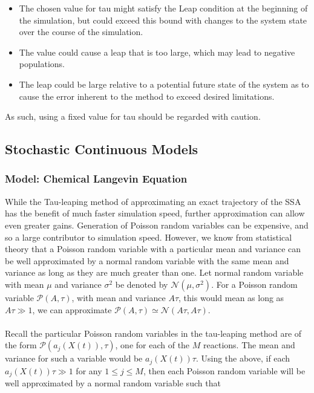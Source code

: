 \documentclass[ugrad,lot,lof,openright,11pt,oneside,onehalfspace]{RUthesis}
\begin{document}
				\begin{itemize}
					\item The chosen value for tau might satisfy the Leap condition at the beginning of the simulation, but could exceed this bound with changes to the system state over the course of the simulation.
					\item The value could cause a leap that is too large, which may lead to negative populations.
					\item The leap could be large relative to a potential future state of the system as to cause the error inherent to the method to exceed desired limitations.
				\end{itemize}

				\noindent
				As such, using a fixed value for tau should be regarded with caution.

		\subsection{Stochastic Continuous Models}

			\subsubsection{Model: Chemical Langevin Equation}

				While the Tau-leaping method of approximating an exact trajectory of the SSA has the benefit of much faster simulation speed, further approximation can allow even greater gains. Generation of Poisson random variables can be expensive, and so a large contributor to simulation speed. However, we know from statistical theory that a Poisson random variable with a particular mean and variance can be well approximated by a normal random variable with the same mean and variance as long as they are much greater than one. Let normal random variable with mean $\mu$ and variance $\sigma^2$ be denoted by $\mathcal{N}(\mu,\sigma^2)$. For a Poisson random variable $\mathcal{P}(A,\tau)$, with mean and variance $A\tau$, this would mean as long as $A\tau \gg 1$, we can approximate $\mathcal{P}(A,\tau) \simeq \mathcal{N}(A\tau,A\tau)$.\\
				\\
				Recall the particular Poisson random variables in the tau-leaping method are of the form $\mathcal{P}(a_j(X(t)),\tau)$, one for each of the $M$ reactions. The mean and variance for such a variable would be $a_j(X(t))\tau$. Using the above, if each $a_j(X(t))\tau \gg 1$ for any $1 \leq j \leq M$, then each Poisson random variable will be well approximated by a normal random variable such that
\end{document}
